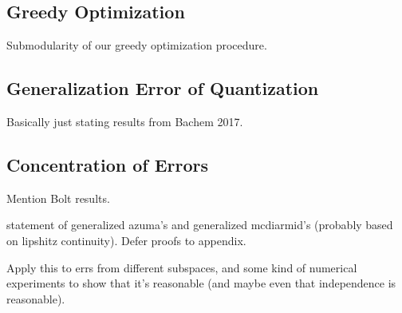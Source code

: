 
\subsection{Greedy Optimization}

Submodularity of our greedy optimization procedure.

\subsection{Generalization Error of Quantization}

Basically just stating results from Bachem 2017.

\subsection{Concentration of Errors}

Mention Bolt results.

statement of generalized azuma's and generalized mcdiarmid's (probably based on lipshitz continuity). Defer proofs to appendix.

Apply this to errs from different subspaces, and some kind of numerical experiments to show that it's reasonable (and maybe even that independence is reasonable).


